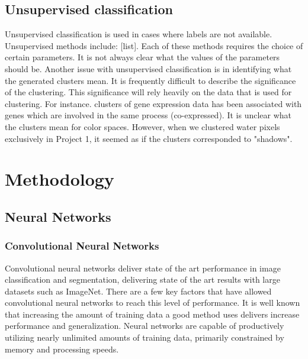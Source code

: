 \documentclass[12pt]{article}
\begin{document}
\subsection{Unsupervised classification}
Unsupervised classification is used in cases where labels are not available. Unsupervised methods include: [list]. Each of these methods requires the choice of certain parameters. It is not always clear what the values of the parameters should be. Another issue with unsupervised classification is in identifying what the generated clusters mean. It is frequently difficult to describe the significance of the clustering. This significance will rely heavily on the data that is used for clustering. For instance. clusters of gene expression data has been associated with genes which are involved in the same process (co-expressed). It is unclear what the clusters mean for color spaces. However, when we clustered water pixels exclusively in Project 1, it seemed as if the clusters corresponded to "shadows".


\section{Methodology}

\subsection{Neural Networks}
\subsubsection{Convolutional Neural Networks}
	Convolutional neural networks deliver state of the art performance in image classification and segmentation, delivering state of the art results with large datasets such as ImageNet.  There are a few key factors that have allowed convolutional neural networks to reach this level of performance.  It is well known that increasing the amount of training data a good method uses delivers increase performance and generalization.  Neural networks are capable of productively utilizing nearly unlimited amounts of training data, primarily constrained by memory and processing speeds.
\end{document}
